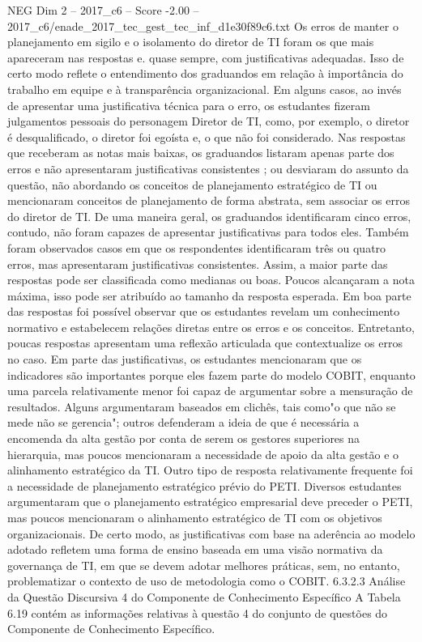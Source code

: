 \begin{textsample}{NEG Dim 2 – 2017\_c6 – Score -2.00 – 2017\_c6/enade\_2017\_tec\_gest\_tec\_inf\_d1e30f89c6.txt}
Os erros de manter o planejamento em sigilo e o isolamento do diretor de TI foram os que mais apareceram nas respostas e. quase sempre, com justificativas adequadas.
Isso de certo modo reflete o entendimento dos graduandos em relação à importância do trabalho em equipe e à transparência organizacional.
Em alguns casos, ao invés de apresentar uma justificativa técnica para o erro, os estudantes fizeram julgamentos pessoais do personagem Diretor de TI, como, por exemplo, o diretor é desqualificado, o diretor foi egoísta e, o que não foi considerado.
Nas respostas que receberam as notas mais baixas, os graduandos listaram apenas parte dos erros e não apresentaram justificativas consistentes ; ou desviaram do assunto da questão, não abordando os conceitos de planejamento estratégico de TI ou mencionaram conceitos de planejamento de forma abstrata, sem associar os erros do diretor de TI.
De uma maneira geral, os graduandos identificaram cinco erros, contudo, não foram capazes de apresentar justificativas para todos eles.
Também foram observados casos em que os respondentes identificaram três ou quatro erros, mas apresentaram justificativas consistentes.
Assim, a maior parte das respostas pode ser classificada como medianas ou boas.
Poucos alcançaram a nota máxima, isso pode ser atribuído ao tamanho da resposta esperada.
Em boa parte das respostas foi possível observar que os estudantes revelam um conhecimento normativo e estabelecem relações diretas entre os erros e os conceitos.
Entretanto, poucas respostas apresentam uma reflexão articulada que contextualize os erros no caso.
Em parte das justificativas, os estudantes mencionaram que os indicadores são importantes porque eles fazem parte do modelo COBIT, enquanto uma parcela relativamente menor foi capaz de argumentar sobre a mensuração de resultados.
Alguns argumentaram baseados em clichês, tais como"o que não se mede não se gerencia"; outros defenderam a ideia de que é necessária a encomenda da alta gestão por conta de serem os gestores superiores na hierarquia, mas poucos mencionaram a necessidade de apoio da alta gestão e o alinhamento estratégico da TI.
Outro tipo de resposta relativamente frequente foi a necessidade de planejamento estratégico prévio do PETI.
Diversos estudantes argumentaram que o planejamento estratégico empresarial deve preceder o PETI, mas poucos mencionaram o alinhamento estratégico de TI com os objetivos organizacionais.
De certo modo, as justificativas com base na aderência ao modelo adotado refletem uma forma de ensino baseada em uma visão normativa da governança de TI, em que se devem adotar melhores práticas, sem, no entanto, problematizar o contexto de uso de metodologia como o COBIT. 6.3.2.3 Análise da Questão Discursiva 4 do Componente de Conhecimento Específico A Tabela 6.19 contém as informações relativas à questão 4 do conjunto de questões do Componente de Conhecimento Específico.

\end{textsample}
